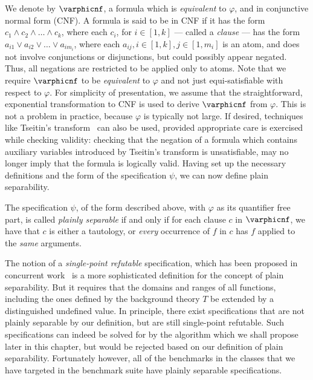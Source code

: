 We denote by $\varphicnf$, a formula which is \emph{equivalent} to
$\varphi$, and in conjunctive normal form (CNF). A formula is said to
be in CNF if it has the form $c_1 \wedge c_2 \wedge \ldots \wedge
c_k$, where each $c_i$, for $i \in [1, k]$ --- called a \emph{clause}
--- has the form $a_{i1} \vee a_{i2} \vee \ldots \vee a_{im_i}$, where
each $a_{ij}, i \in [1,k], j \in [1,m_i]$ is an atom, and does not
involve conjunctions or disjunctions, but could possibly appear
negated. Thus, all negations are restricted to be applied only to
atoms. Note that we require $\varphicnf$ to be \emph{equivalent} to
$\varphi$ and not just equi-satisfiable with respect to $\varphi$.
For simplicity of presentation, we assume that the straightforward,
exponential transformation to CNF is used to derive $\varphicnf$ from
$\varphi$. This is not a problem in practice, because $\varphi$ is
typically not large. If desired, techniques like Tseitin's
transform~\cite{tseitin-83} can also be used, provided appropriate
care is exercised while checking validity: checking that the negation
of a formula which contains auxiliary variables introduced by
Tseitin's transform is unsatisfiable, may no longer imply that the
formula is logically valid. Having set up the necessary definitions
and the form of the specification $\psi$, we can now define plain
separability.

\begin{definition}
\label{defn:separability}
The \emph{\sygusbody} specification $\psi$, of the form described above, with
$\varphi$ as its quantifier free part, is called \emph{plainly separable} if
and only if for each clause $c$ in $\varphicnf$, we have that $c$ is
either a tautology, or \emph{every} occurrence of $f$ in $c$ has $f$
applied to the \emph{same} arguments.
\end{definition}
The notion of a \emph{single-point refutable} specification, which has
been proposed in concurrent work~\cite{madhusudan-16} is a more
sophisticated definition for the concept of plain separability. But it
requires that the domains and ranges of all functions, including the
ones defined by the background theory $T$ be extended by a
distinguished undefined value. In principle, there exist
specifications that are not plainly separable by our definition, but
are still single-point refutable. Such specifications can indeed be
solved for by the algorithm which we shall propose later in this
chapter, but would be rejected based on our definition of plain
separability. Fortunately however, all of the benchmarks in the
classes that we have targeted in the \sygusbody benchmark suite have
plainly separable specifications.

